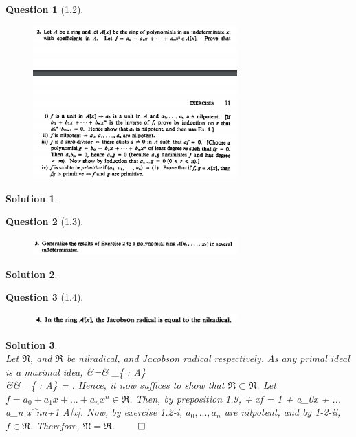 \documentclass[11pt]{article}
\theoremstyle{plain}
\def\eQb#1\eQe{\begin{eqnarray*}#1\end{eqnarray*}}
\theoremstyle{quest}
\newtheorem*{question}{Question}
\newtheorem*{solution}{Solution}
\begin{document}
\begin{question}[1.2]
\hfill
\begin{figure}[h!]
  \centering
    \includegraphics[width=0.7\textwidth]{d-1-2.png}
\end{figure}
\end{question}
\begin{solution} \hfill \\


\end{solution}
\begin{question}[1.3]
\hfill
\begin{figure}[h!]
  \centering
    \includegraphics[width=0.7\textwidth]{d-1-3.png}
\end{figure}
\end{question}
\begin{solution} \hfill \\


\end{solution}
\begin{question}[1.4]
\hfill
\begin{figure}[h!]
  \centering
    \includegraphics[width=0.7\textwidth]{d-1-4.png}
\end{figure}
\end{question}
\begin{solution} \hfill \\
Let $\mathfrak{N}$, and $\mathfrak{R}$ be nilradical, and Jacobson radical 
respectively. As any primal ideal is a maximal idea,
\eQb
\mathfrak{N} &=& \bigcap_{\{ \> : \>  
\> A\}}  \\ 
&\subset& 
\bigcap_{\{  \> : \>  \> A\}} 
= .
\eQe
Hence, it now suffices to show that $\mathfrak{R} \subset \mathfrak{N}$.
Let $f = a_0 + a_1x + ... + a_n x^n \in \mathfrak{R}$. Then, by preposition 1.9,
\eQb
1 + xf = 1 + a_0x + ... a_n x^n{n+1} \>\>\>  \>\>\> A[x].
\eQe 
Now, by exercise 1.2-i, $a_0 , ... , a_n$ are nilpotent, and by 1-2-ii,
$f \in \mathfrak{N}$. Therefore, $\mathfrak{N} = \mathfrak{R}$. \hfill $\qed$


\end{solution}
\end{document}
